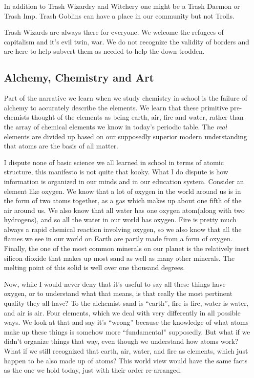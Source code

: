 In addition to Trash Wizardry and Witchery one might be a Trash Daemon
or Trash Imp. Trash Goblins can have a place in our community but not
Trolls.

Trash Wizards are always there for everyone. We welcome the refugees of
capitalism and it's evil twin, war. We do not recognize the validity of
borders and are here to help subvert them as needed to help the down
trodden.

\subsection{Alchemy, Chemistry and Art}\label{alchemy-chemistry-and-art}

Part of the narrative we learn when we study chemistry in school is the
failure of alchemy to accurately describe the elements. We learn that
these primitive pre-chemists thought of the elements as being earth,
air, fire and water, rather than the array of chemical elements we know
in today's periodic table. The \emph{real} elements are divided up based
on our supposedly superior modern understanding that atoms are the basis
of all matter.

I dispute none of basic science we all learned in school in terms of
atomic structure, this manifesto is not quite that kooky. What I do
dispute is how information is organized in our minds and in our
education system. Consider an element like oxygen. We know that a lot of
oxygen in the world around us is in the form of two atoms together, as a
gas which makes up about one fifth of the air around us. We also know
that all water has one oxygen atom(along with two hydrogens), and so all
the water in our world has oxygen. Fire is pretty much always a rapid
chemical reaction involving oxygen, so we also know that all the flames
we see in our world on Earth are partly made from a form of oxygen.
Finally, the one of the most common minerals on our planet is the
relatively inert silicon dioxide that makes up most sand as well as many
other minerals. The melting point of this solid is well over one
thousand degrees.

Now, while I would never deny that it's useful to say all these things
have oxygen, or to understand what that means, is that really the most
pertinent quality they all have? To the alchemist sand is ``earth'',
fire is fire, water is water, and air is air. Four elements, which we
deal with very differently in all possible ways. We look at that and say
it's ``wrong'' because the knowledge of what atoms make up these things
is somehow more ``fundamental'' supposedly. But what if we didn't
organize things that way, even though we understand how atoms work? What
if we still recognized that earth, air, water, and fire as elements,
which just happen to be also made up of atoms? This world view would
have the same facts as the one we hold today, just with their order
re-arranged.

